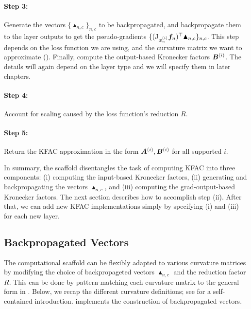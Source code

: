 \paragraph{Step 3:} Generate the vectors $\{\blacktriangle_{n,c}\}_{n,c}$ to be backpropagated, and backpropagate them to the layer outputs to get the pseudo-gradients $\{(\mathrm{J}_{{\bm{x}}_n^{(i)}} {\bm{f}}_n)^{\top} \blacktriangle_{n,c} \}_{n,c}$.
This step depends on the loss function we are using, and the curvature matrix we want to approximate ().
Finally, compute the output-based Kronecker factors ${\bm{B}}^{(i)}$.
The details will again depend on the layer type and we will specify them in later chapters.

\paragraph{Step 4:} Account for scaling caused by the loss function's reduction $R$.

\paragraph{Step 5:} Return the KFAC approximation in the form ${\bm{A}}^{(i)}, {\bm{B}}^{(i)}$ for all supported $i$.

In summary, the scaffold disentangles the task of computing KFAC into three components: (i) computing the input-based Kronecker factors, (ii) generating and backpropagating the vectors $\blacktriangle_{n,c}$, and (iii) computing the grad-output-based Kronecker factors.
The next section describes how to accomplish step (ii).
After that, we can add new KFAC implementations simply by specifying (i) and (iii) for each new layer.

\subsection{Backpropagated Vectors}\label{subsec:backpropagated-vectors}
The computational scaffold can be flexibly adapted to various curvature matrices by modifying the choice of backpropageted vectors $\blacktriangle_{n,c}$ and the reduction factor $R$.
This can be done by pattern-matching each curvature matrix to the general form in .
Below, we recap the different curvature definitions; see  for a self-contained introduction.
 implements the construction of backpropagated vectors.

